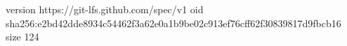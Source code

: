 version https://git-lfs.github.com/spec/v1
oid sha256:e2bd42dde8934c54462f3a62e0a1b9be02c913ef76cff62f30839817d9fbcb16
size 124
